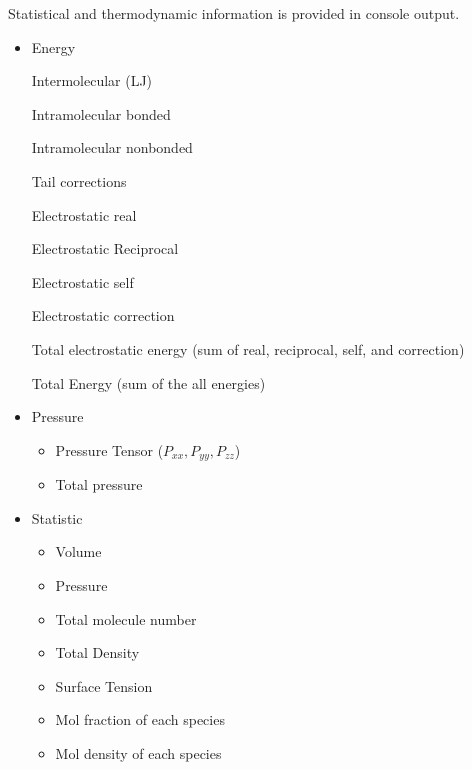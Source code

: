 \documentclass[letterpaper,10pt,english]{sphinxmanual}
\begin{document}
Statistical and thermodynamic information is provided in console output.
\begin{itemize}
\item {} 
Energy

\textendash{} Intermolecular (LJ)

\textendash{} Intramolecular bonded

\textendash{} Intramolecular nonbonded

\textendash{} Tail corrections

\textendash{} Electrostatic real

\textendash{} Electrostatic Reciprocal

\textendash{} Electrostatic self

\textendash{} Electrostatic correction

\textendash{} Total electrostatic energy (sum of real, reciprocal, self, and correction)

\textendash{} Total Energy (sum of the all energies)

\item {} 
Pressure
\begin{itemize}
\item {} 
Pressure Tensor (\(P_{xx},P_{yy},P_{zz}\))

\item {} 
Total pressure

\end{itemize}

\item {} 
Statistic
\begin{itemize}
\item {} 
Volume

\item {} 
Pressure

\item {} 
Total molecule number

\item {} 
Total Density

\item {} 
Surface Tension

\item {} 
Mol fraction of each species

\item {} 
Mol density of each species

\end{itemize}

\end{itemize}
\end{document}
